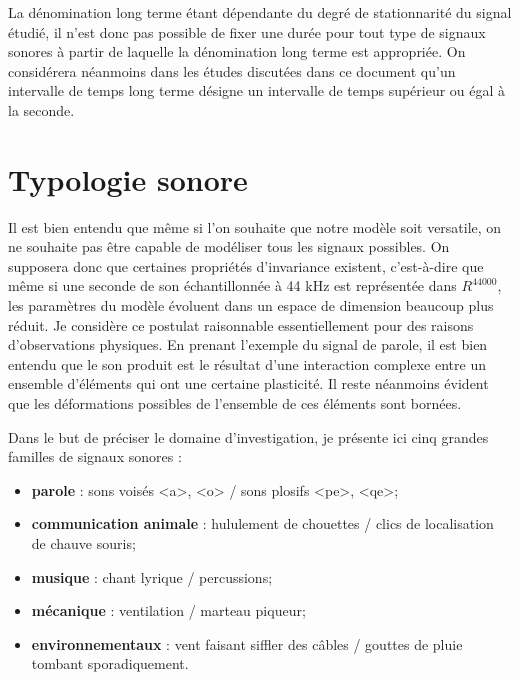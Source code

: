 
La dénomination \og long terme \fg  étant dépendante du degré de stationnarité du signal étudié, il n'est donc pas possible de fixer une durée pour tout type de signaux sonores à partir de laquelle la dénomination \og long terme \fg est appropriée. On considérera néanmoins dans les études discutées dans ce document qu'un intervalle de temps  \og long terme \fg désigne un intervalle de temps supérieur ou égal à la seconde.

\section{ \nmu Typologie sonore} \label{sec:typologie}

Il est bien entendu que même si l'on souhaite que notre modèle soit versatile, on ne souhaite pas être capable de modéliser tous les signaux possibles. On supposera donc que certaines propriétés d'invariance existent, c'est-à-dire que même si une seconde de son échantillonnée à 44 kHz est représentée dans $R^{44000}$, les paramètres du modèle évoluent dans un espace de dimension beaucoup plus réduit. Je considère ce postulat raisonnable essentiellement pour des raisons d'observations physiques. En prenant l'exemple du signal de parole, il est bien entendu que le son produit est le résultat d'une interaction complexe entre un ensemble d'éléments qui ont une certaine plasticité. Il reste néanmoins évident que les déformations possibles de l'ensemble de ces éléments sont bornées.

Dans le but de préciser le domaine d'investigation, je présente ici cinq grandes familles de signaux sonores :
\begin{itemize}
  \item \textbf{parole} : sons voisés <a>, <o> / sons plosifs <pe>, <qe>;
  \item \textbf{communication animale} : hululement de chouettes / clics de localisation de chauve souris;
  \item \textbf{musique} : chant lyrique / percussions;
  \item \textbf{mécanique} : ventilation / marteau piqueur;
  \item \textbf{environnementaux} : vent faisant siffler des câbles / gouttes de pluie tombant sporadiquement.
\end{itemize}


